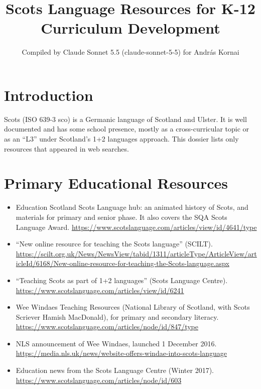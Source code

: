 \documentclass[12pt]{article}
\title{Scots Language Resources for K-12 Curriculum Development}
\author{Compiled by Claude Sonnet 5.5 (claude-sonnet-5-5) for Andr\'as Kornai}
\date{}
\begin{document}
\maketitle

\section{Introduction}
Scots (ISO 639-3 sco) is a Germanic language of Scotland and Ulster. It is well documented and has some school presence, mostly as a cross-curricular topic or as an ``L3'' under Scotland's 1+2 languages approach. This dossier lists only resources that appeared in web searches.

\section{Primary Educational Resources}
\begin{itemize}
\item Education Scotland Scots Language hub: an animated history of Scots, and materials for primary and senior phase. It also covers the SQA Scots Language Award. \url{https://www.scotslanguage.com/articles/view/id/4641/type}
\item ``New online resource for teaching the Scots language'' (SCILT). \url{https://scilt.org.uk/News/NewsView/tabid/1311/articleType/ArticleView/articleId/6168/New-online-resource-for-teaching-the-Scots-language.aspx}
\item ``Teaching Scots as part of 1+2 languages'' (Scots Language Centre). \url{https://www.scotslanguage.com/articles/view/id/6241}
\item Wee Windaes Teaching Resources (National Library of Scotland, with Scots Scriever Hamish MacDonald), for primary and secondary literacy. \url{https://www.scotslanguage.com/articles/node/id/847/type}
\item NLS announcement of Wee Windaes, launched 1 December 2016. \url{https://media.nls.uk/news/website-offers-windae-into-scots-language}
\item Education news from the Scots Language Centre (Winter 2017). \url{https://www.scotslanguage.com/articles/node/id/603}
\end{itemize}
\end{document}
